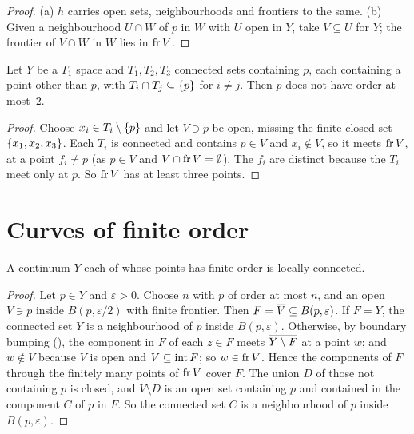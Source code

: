 \begin{proof}
(a) $h$ carries open sets, neighbourhoods and frontiers to the same. (b) Given a neighbourhood $U\cap W$ of $p$ in $W$
with $U$ open in $Y$, take $V\subseteq U$ for $Y$; the frontier of $V\cap W$ in $W$ lies in $\operatorname{fr} V$.
\end{proof}


\begin{lemma}\label{lem:triod}
Let $Y$ be a $T_1$ space and $T_1,T_2,T_3$ connected sets containing $p$, each containing a point other than $p$,
with $T_i\cap T_j\subseteq\left\{ p \right\}$ for $i\ne j$. Then $p$ does not have order at most~$2$.
\end{lemma}

\begin{proof}
Choose $x_i\in T_i\setminus\left\{ p \right\}$ and let $V\ni p$ be open, missing the finite closed set $\left\{ x_1,x_2,x_3 \right\}$. Each $T_i$
is connected and contains $p\in V$ and $x_i\notin V$, so it meets $\operatorname{fr} V$, at a point $f_i\ne p$ (as $p\in V$ and $V\cap\operatorname{fr}
V=\emptyset$). The $f_i$ are distinct because the $T_i$ meet only at $p$. So $\operatorname{fr} V$ has at least three points.
\end{proof}


\section{Curves of finite order}

\begin{proposition}\label{prop:finite-order-lc}
A continuum $Y$ each of whose points has finite order is locally connected.
\end{proposition}

\begin{proof}
Let $p\in Y$ and $\varepsilon>0$. Choose $n$ with $p$ of order at most $n$, and an open $V\ni p$ inside $\bar B(p,\varepsilon/2)$
with finite frontier. Then $F=\overline{V}\subseteq B(p,\varepsilon)$. If $F=Y$, the connected set $Y$ is a neighbourhood of $p$ inside
$B(p,\varepsilon)$. Otherwise, by boundary bumping (), the component in $F$ of each $z\in F$ meets
$\overline{Y\setminus F}$ at a point $w$; and $w\notin V$ because $V$ is open and $V\subseteq\operatorname{int} F$; so $w\in\operatorname{fr} V$. Hence the
components of $F$ through the finitely many points of $\operatorname{fr} V$ cover $F$. The union $D$ of those not containing $p$ is
closed, and $V\setminus D$ is an open set containing $p$ and contained in the component $C$ of $p$ in $F$. So the connected set $C$
is a neighbourhood of $p$ inside $B(p,\varepsilon)$.
\end{proof}

